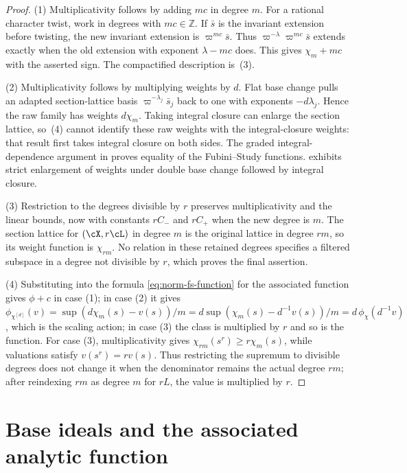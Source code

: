 \begin{proof}
(1) Multiplicativity follows by adding $mc$ in degree $m$. For a rational character twist, work in degrees with $mc\in\mathbb Z$. If $\bar s$ is the invariant extension before twisting, the new invariant extension is $\varpi^{mc}\bar s$. Thus $\varpi^{-\lambda}\varpi^{mc}\bar s$ extends exactly when the old extension with exponent $\lambda-mc$ does. This gives $\chi_m+mc$ with the asserted sign. The compactified description is \,(3).

(2) Multiplicativity follows by multiplying weights by $d$. Flat base change pulls an adapted section-lattice basis $\varpi^{-\lambda_j}\bar s_j$ back to one with exponents $-d\lambda_j$. Hence the raw family has weights $d\chi_m$. Taking integral closure can enlarge the section lattice, so \,(4) cannot identify these raw weights with the integral-closure weights: that result first takes integral closure on both sides. The graded integral-dependence argument in  proves equality of the Fubini--Study functions.  exhibits strict enlargement of weights under double base change followed by integral closure.

(3)  Restriction to the degrees divisible by $r$ preserves
multiplicativity and the linear bounds, now with constants $rC_-$ and
$rC_+$ when the new degree is $m$.  The section lattice for
$(\cX,r\cL)$ in degree $m$ is the original lattice in degree $rm$,
so its weight function is $\chi_{rm}$.  No relation in these retained
degrees specifies a filtered subspace in a degree not divisible by $r$,
which proves the final assertion.

(4)  Substituting into the formula \eqref{eq:norm-fs-function} for the
associated function gives $\phi+c$ in case (1); in case (2) it gives
$\phi_{\chi^{[d]}}(v)=\sup(d\chi_m(s)-v(s))/m
=d\sup(\chi_m(s)-d^{-1}v(s))/m=d\,\phi_\chi(d^{-1}v)$, which is the scaling
action; in case (3) the class is multiplied by $r$ and so is the
function.  For case (3), multiplicativity gives
$\chi_{rm}(s^r)\geq r\chi_m(s)$, while valuations satisfy
$v(s^r)=rv(s)$.  Thus restricting the supremum to divisible degrees does
not change it when the denominator remains the actual degree $rm$; after
reindexing $rm$ as degree $m$ for $rL$, the value is multiplied by
$r$.
\end{proof}

\section{Base ideals and the associated analytic function}
\label{sec:ch33-base-ideals}


